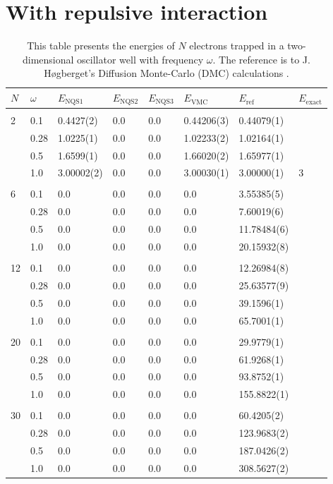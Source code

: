 \section{With repulsive interaction}
\begin{table} [H]
	\caption{This table presents the energies of $N$ electrons trapped in a two-dimensional oscillator well with frequency $\omega$. The reference is to J. Høgberget's Diffusion Monte-Carlo (DMC) calculations \cite{hogberget_quantum_2013}.} 
	\begin{tabularx}{\textwidth}{l:l|XXXXXX} \hline\hline
		\label{tab:quantumdotswinteraction2D}
		$N$ & $\omega$ & $E_{\text{NQS1}}$ & $E_{\text{NQS2}}$ & $E_{\text{NQS3}}$ & $E_{\text{VMC}}$ & $E_{\text{ref}} $ & $E_{\text{exact}}$ \\ \hline \\
		2 & 0.1 & 0.4427(2) & 0.0 & 0.0 & 0.44206(3) & 0.44079(1) & \\ 
		& 0.28 & 1.0225(1) & 0.0 & 0.0 & 1.02233(2) & 1.02164(1) & \\
		& 0.5 & 1.6599(1) & 0.0 & 0.0 & 1.66020(2) & 1.65977(1)  \\
		& 1.0 & 3.00002(2) & 0.0 & 0.0 & 3.00030(1) & 3.00000(1) & 3  \\ \hdashline \\
		
		6 & 0.1 & 0.0 & 0.0 & 0.0 & 0.0 & 3.55385(5) \\ 
		& 0.28 & 0.0 & 0.0 & 0.0 & 0.0 & 7.60019(6) \\
		& 0.5 & 0.0 & 0.0 & 0.0 & 0.0 & 11.78484(6) \\
		& 1.0 & 0.0 & 0.0 & 0.0 & 0.0 & 20.15932(8) \\ \hdashline \\
		
		12 & 0.1 & 0.0 & 0.0 & 0.0 & 0.0 & 12.26984(8) \\ 
		& 0.28 & 0.0 & 0.0 & 0.0 & 0.0 & 25.63577(9) \\
		& 0.5 & 0.0 & 0.0 & 0.0 & 0.0 & 39.1596(1) \\
		& 1.0 & 0.0 & 0.0 & 0.0 & 0.0 & 65.7001(1) \\ \hdashline \\
		
		20 & 0.1 & 0.0 & 0.0 & 0.0 & 0.0 & 29.9779(1) \\ 
		& 0.28 & 0.0 & 0.0 & 0.0 & 0.0 & 61.9268(1) \\
		& 0.5 & 0.0 & 0.0 & 0.0 & 0.0 & 93.8752(1) \\
		& 1.0 & 0.0 & 0.0 & 0.0 & 0.0 & 155.8822(1) \\ \hdashline \\
		
		30 & 0.1 & 0.0 & 0.0 & 0.0 & 0.0 & 60.4205(2)\\ 
		& 0.28 & 0.0 & 0.0 & 0.0 & 0.0 & 123.9683(2)\\
		& 0.5 & 0.0 & 0.0 & 0.0 & 0.0 & 187.0426(2)\\
		& 1.0 & 0.0 & 0.0 & 0.0 & 0.0 & 308.5627(2)\\ \hline\hline
	\end{tabularx}
\end{table}

